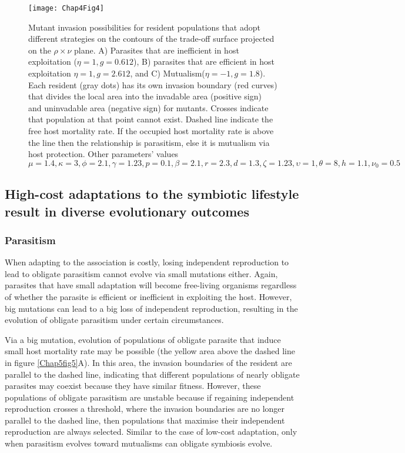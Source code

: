 \documentclass[11.5pt]{article}
\begin{document}
\begin{figure} [H]
    \centering
    \texttt{[image: Chap4Fig4]}
    \caption[Evolutionary trajectory at low-cost adaptation]{Mutant invasion possibilities for resident populations that adopt different strategies on the contours of the trade-off surface projected on the $\rho \times \nu$ plane. A) Parasites that are inefficient in host exploitation ($\eta=1, g=0.612$), B) parasites that are efficient in host exploitation $\eta=1, g=2.612$, and C) Mutualism($\eta = -1, g=1.8$). Each resident (gray dots) has its own invasion boundary (red curves) that divides the local area into the invadable area (positive sign) and uninvadable area (negative sign) for mutants. Crosses indicate that population at that point cannot exist. Dashed line indicate the free host mortality rate. If the occupied host mortality rate is above the line then the relationship is parasitism, else it is mutualism via host protection. Other parameters' values $\mu=1.4, \kappa=3, \phi=2.1, \gamma=1.23, p=0.1, \beta=2.1, r=2.3, d=1.3, \zeta=1.23, \upsilon=1, \theta=8, h=1.1,  \nu_0=0.5$}
    \label{Chap5fig4}
\end{figure}

\subsection{High-cost adaptations to the symbiotic lifestyle result in diverse evolutionary outcomes}

\subsubsection*{Parasitism}
When adapting to the association is costly, losing independent reproduction to lead to obligate parasitism cannot evolve via small mutations either. Again, parasites that have small adaptation will become free-living organisms regardless of whether the parasite is efficient or inefficient in exploiting the host. However, big mutations can lead to a big loss of independent reproduction, resulting in the evolution of obligate parasitism under certain circumstances. 

\medskip

Via a big mutation, evolution of populations of obligate parasite that induce small host mortality rate may be possible (the yellow area above the dashed line in figure \ref{Chap5fig5}A). In this area, the invasion boundaries of the resident are parallel to the dashed line, indicating that different populations of nearly obligate parasites may coexist because they have similar fitness. However, these populations of obligate parasitism are unstable because if regaining independent reproduction crosses a threshold, where the invasion boundaries are no longer parallel to the dashed line, then populations that maximise their independent reproduction are always selected. Similar to the case of low-cost adaptation, only when parasitism evolves toward mutualisms can obligate symbiosis evolve. 
\end{document}
